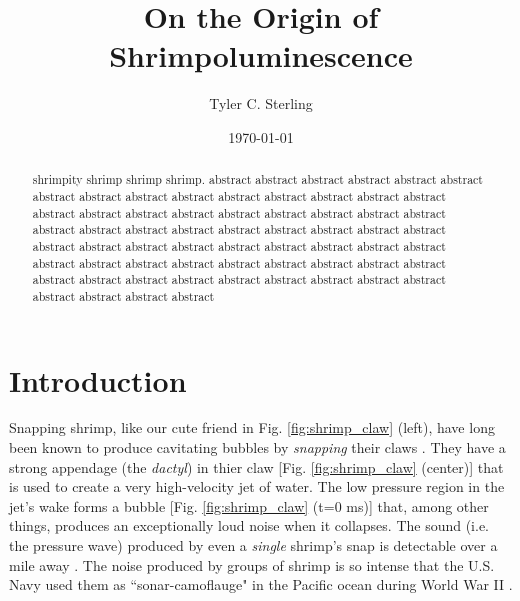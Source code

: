 \documentclass[rmp,aps,nofootinbib,superscriptaddress,floatfix,10pt]{revtex4-2}
\begin{document}
\title{On the Origin of Shrimpoluminescence}

\author{Tyler C. Sterling}

\date{\today}

\begin{abstract}
shrimpity shrimp shrimp shrimp. abstract abstract abstract abstract abstract abstract abstract abstract abstract abstract abstract abstract abstract abstract abstract abstract abstract abstract abstract abstract abstract abstract abstract abstract abstract abstract abstract abstract abstract abstract abstract abstract abstract abstract abstract abstract abstract abstract abstract abstract abstract abstract abstract abstract abstract abstract abstract abstract abstract abstract abstract abstract abstract abstract abstract abstract abstract abstract abstract abstract abstract abstract abstract abstract 
\end{abstract}

\maketitle





\section{Introduction}
Snapping shrimp, like our cute friend in Fig. \ref{fig:shrimp_claw} (left), have long been known to produce cavitating bubbles by \emph{snapping} their claws \cite{versluis2000snapping,lohse2001snapping,tang2019bioinspired}. They have a strong appendage (the \emph{dactyl}) in thier claw [Fig. \ref{fig:shrimp_claw} (center)] that is used to create a very high-velocity jet of water. The low pressure region in the jet's wake forms a bubble [Fig. \ref{fig:shrimp_claw} (t=0 ms)] that, among other things, produces an exceptionally loud noise when it collapses. The sound (i.e. the pressure wave) produced by even a \emph{single} shrimp's snap is detectable over a mile away \cite{everest1948acoustical}. The noise produced by groups of shrimp is so intense that the U.S. Navy used them as ``sonar-camoflauge" in the Pacific ocean during World War II \cite{versluis2000snapping}. 
\end{document}
